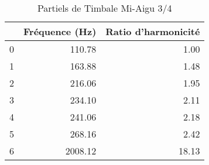 \begin{table}
\centering
\caption{Partiels de Timbale Mi-Aigu 3/4}
\label{table:partiels-timbale-miaigu-3.wav}
\begin{tabular}{lrr}
\toprule
{} &  Fréquence (Hz) &  Ratio d'harmonicité \\
\midrule
0 &          110.78 &                 1.00 \\
1 &          163.88 &                 1.48 \\
2 &          216.06 &                 1.95 \\
3 &          234.10 &                 2.11 \\
4 &          241.06 &                 2.18 \\
5 &          268.16 &                 2.42 \\
6 &         2008.12 &                18.13 \\
\bottomrule
\end{tabular}
\end{table}
